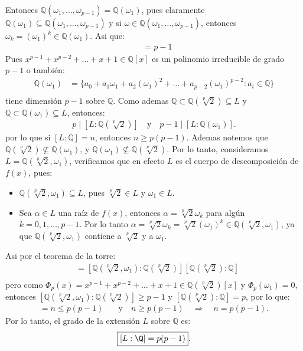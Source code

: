 \begin{solucion}
Entonces $\mathbb Q(\omega_1, \ldots, \omega_{p-1}) = \mathbb Q(\omega_1)$, pues claramente $\mathbb Q(\omega_1) \subseteq \mathbb Q(\omega_1, \ldots, \omega_{p-1})$ y si $\omega \in \mathbb Q(\omega_1, \ldots, \omega_{p-1})$, entonces $\omega_k = (\omega_1)^k \in \mathbb Q(\omega_1)$. Asi que:
\begin{align*}
  [\mathbb Q(\omega_1):\Q] &= p-1
\end{align*}
Pues $x^{p-1} + x^{p-2} + \dots + x + 1 \in \mathbb Q[x]$  es un polinomio irreducible de grado $p-1$ o también:
\begin{align*}
  \mathbb Q(\omega_1) &= \{
a_0 + a_1 \omega_1 + a_2 \left(\omega_1\right)^2 + \ldots + a_{p-2} \left(\omega_1\right)^{p-2} : a_i \in \mathbb Q\}\\
\end{align*}
tiene dimensión $p-1$ sobre $\mathbb Q$. 
Como ademas $\mathbb Q \subset \mathbb Q(\sqrt[p]{2}) \subseteq L$ y $\mathbb Q \subset \mathbb Q(\omega_1) \subseteq L$, entonces:
\begin{align*}
  p\mid [L:\mathbb Q(\sqrt[p]{2})] \quad \text{y} \quad p-1\mid [L:\mathbb Q(\omega_1)].
\end{align*}
por lo que si $[L:\mathbb Q] = n$, entonces $n \geq p(p-1)$.
Ademas notemos que $\mathbb Q(\sqrt[p]{2}) \not \subseteq \mathbb Q(\omega_1)$, y $\mathbb Q(\omega_1) \not \subseteq \mathbb Q(\sqrt[p]{2})$. Por lo tanto, consideramos $L = \mathbb Q(\sqrt[p]{2}, \omega_1)$, verificamos que en efecto $L$ es el cuerpo de descomposición de $f(x)$, pues:
\begin{itemize}
  \item [$\subseteq$] $\mathbb Q(\sqrt[p]{2}, \omega_1) \subseteq L$, pues $\sqrt[p]{2} \in L$ y $\omega_1 \in L$.
  \item [$\supseteq$] Sea $\alpha \in L$ una raíz de $f(x)$, entonces $\alpha = \sqrt[p]{2} \omega_k$ para algún $k = 0,1,\ldots,p-1$. Por lo tanto $\alpha = \sqrt[p]{2} \omega_k = \sqrt[p]{2} (\omega_1)^k \in \mathbb Q(\sqrt[p]{2}, \omega_1)$, ya que $\mathbb Q(\sqrt[p]{2}, \omega_1)$ contiene a $\sqrt[p]{2}$ y a $\omega_1$.
\end{itemize}
Asi por el teorema de la torre:
\begin{align*}
  [L:\mathbb Q] &= [\mathbb Q(\sqrt[p]{2}, \omega_1):\mathbb Q(\sqrt[p]{2})][\mathbb Q(\sqrt[p]{2}):\mathbb Q]\\
\end{align*}
pero como $\Phi_p(x) = x^{p-1} + x^{p-2} + \ldots + x + 1 \in \mathbb Q(\sqrt[p]{2})[x]$  y $\Phi_p(\omega_1) = 0$, 
entonces $[\mathbb Q(\sqrt[p]{2}, \omega_1):\mathbb Q(\sqrt[p]{2})] \geq p-1$ y $[\mathbb Q(\sqrt[p]{2}):\mathbb Q] = p$, por lo que:
\begin{align*}
  [L:\mathbb Q] = n \leq p(p-1) \quad &\text{y} \quad n\geq p(p-1) \quad \Rightarrow \quad
  n = p(p-1).
\end{align*}
Por lo tanto, el grado de la extensión $L$ sobre $\mathbb Q$ es:
\[
   \boxed{[L:\Q]=p(p-1)}.
\]


\end{solucion}
